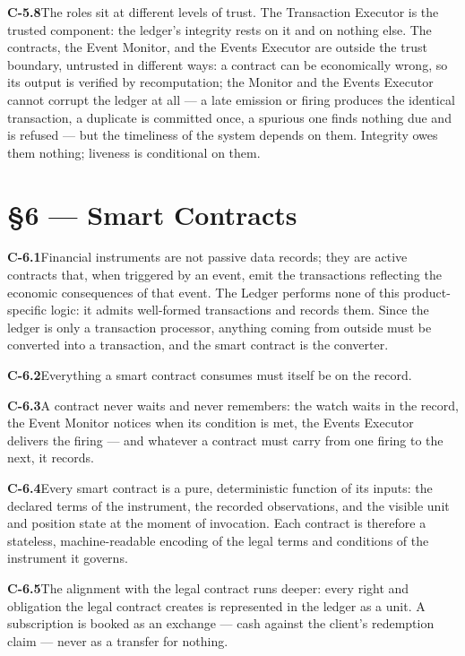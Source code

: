\documentclass[11pt,a4paper]{article}
\newcommand{\clause}[2]{\par\medskip\noindent\textbf{#1}\hspace{0.6em}#2}
\begin{document}
\clause{C-5.8}{The roles sit at different levels of trust. The Transaction Executor
is the trusted component: the ledger's integrity rests on it and on nothing else.
The contracts, the Event Monitor, and the Events Executor are outside the trust
boundary, untrusted in different ways: a contract can be economically wrong, so
its output is verified by recomputation; the Monitor and the Events Executor
cannot corrupt the ledger at all --- a late emission or firing produces the
identical transaction, a duplicate is committed once, a spurious one finds nothing
due and is refused --- but the timeliness of the system depends on them. Integrity
owes them nothing; liveness is conditional on them.}

\section*{\S6 --- Smart Contracts}

\clause{C-6.1}{Financial instruments are not passive data records; they are active
contracts that, when triggered by an event, emit the transactions reflecting the
economic consequences of that event. The Ledger performs none of this
product-specific logic: it admits well-formed transactions and records them. Since
the ledger is only a transaction processor, anything coming from outside must be
converted into a transaction, and the smart contract is the converter.}

\clause{C-6.2}{Everything a smart contract consumes must itself be on the record.}

\clause{C-6.3}{A contract never waits and never remembers: the watch waits in the
record, the Event Monitor notices when its condition is met, the Events Executor
delivers the firing --- and whatever a contract must carry from one firing to the
next, it records.}

\clause{C-6.4}{Every smart contract is a pure, deterministic function of its
inputs: the declared terms of the instrument, the recorded observations, and the
visible unit and position state at the moment of invocation. Each contract is
therefore a stateless, machine-readable encoding of the legal terms and conditions
of the instrument it governs.}

\clause{C-6.5}{The alignment with the legal contract runs deeper: every right and
obligation the legal contract creates is represented in the ledger as a unit. A
subscription is booked as an exchange --- cash against the client's redemption
claim --- never as a transfer for nothing.}
\end{document}
